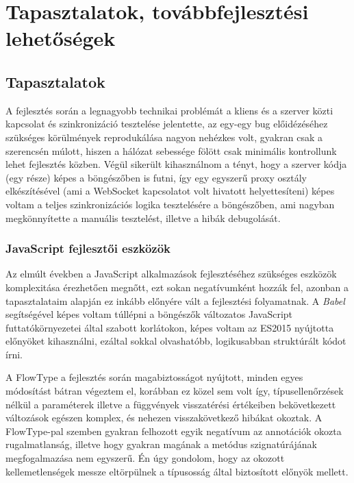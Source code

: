 \chapter{Tapasztalatok, továbbfejlesztési lehetőségek}

\section{Tapasztalatok}

A fejlesztés során a legnagyobb technikai problémát a kliens és a szerver közti
kapcsolat és szinkronizáció tesztelése jelentette, az egy-egy bug előidézéséhez
szükséges körülmények reprodukálása nagyon nehézkes volt, gyakran csak a
szerencsén múlott, hiszen a hálózat sebessége fölött csak minimális kontrollunk
lehet fejlesztés közben. Végül sikerült kihasználnom a tényt, hogy a szerver
kódja (egy része) képes a böngészőben is futni, így egy egyszerű proxy osztály
elkészítésével (ami a WebSocket kapcsolatot volt hivatott helyettesíteni) képes
voltam a teljes szinkronizációs logika tesztelésére a böngészőben, ami nagyban
megkönnyítette a manuális tesztelést, illetve a hibák debugolását.

\subsection{JavaScript fejlesztői eszközök}

Az elmúlt években a JavaScript alkalmazások fejlesztéséhez szükséges eszközök
komplexitása érezhetően megnőtt, ezt sokan negatívumként hozzák fel, azonban a
tapasztalataim alapján ez inkább előnyére vált a fejlesztési folyamatnak. A
\emph{Babel} segítségével képes voltam túllépni a böngészők változatos
JavaScript futtatókörnyezetei által szabott korlátokon, képes voltam az ES2015
nyújtotta előnyöket kihasználni, ezáltal sokkal olvashatóbb, logikusabban
struktúrált kódot írni.

A FlowType a fejlesztés során magabiztosságot nyújtott, minden egyes módosítást
bátran végeztem el, korábban ez közel sem volt így, típusellenőrzések nélkül a
paraméterek illetve a függvények visszatérési értékeiben bekövetkezett
változások egészen komplex, és nehezen visszakövetkező hibákat okoztak. A
FlowType-pal szemben gyakran felhozott egyik negatívum az annotációk okozta
rugalmatlanság, illetve hogy gyakran magának a metódus szignatúrájának
megfogalmazása nem egyszerű. Én úgy gondolom, hogy az okozott kellemetlenségek
messze eltörpülnek a típusosság által biztosított előnyök mellett.

